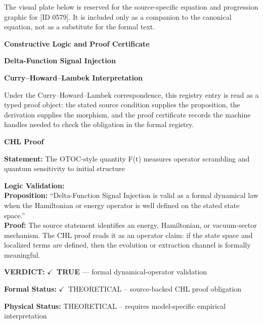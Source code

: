 \begingroup\footnotesize\sloppy
The visual plate below is reserved for the source-specific equation and progression graphic for [ID 0579]. It is included only as a companion to the canonical equation, not as a substitute for the formal text.
\par\endgroup
\ifTZPDarkEdition
{}
\fi

\clearpage
\begingroup\tzpsupportsetup
\noindent\textbf{\fontsize{10.8pt}{12.8pt}\selectfont [ID 0579] Constructive Logic and Proof Certificate}\par
\noindent\textbf{\fontsize{10pt}{12pt}\selectfont Delta-Function Signal Injection}\par
\vspace{0.45em}
\begingroup
\footnotesize
\setlength{\parskip}{0.22em}
\setlength{\parindent}{0pt}
\noindent\textbf{Curry--Howard--Lambek Interpretation}\par
Under the Curry--Howard--Lambek correspondence, this registry entry is read as a typed proof
object: the stated source condition supplies the proposition, the derivation supplies the
morphism, and the proof certificate records the machine handles needed to check the obligation
in the formal registry.

\vspace{0.45em}
\noindent\textbf{CHL Proof}\par
\textbf{Statement:} The OTOC-style quantity F(t) measures operator scrambling and quantum sensitivity to
initial structure

\textbf{Logic Validation:}\\
\textbf{Proposition:} ``Delta-Function Signal Injection is valid as a formal dynamical law when the Hamiltonian
or energy operator is well defined on the stated state space.''\\
\textbf{Proof:} The source statement identifies an energy, Hamiltonian, or vacuum-sector mechanism. The
CHL proof reads it as an operator claim: if the state space and localized terms are
defined, then the evolution or extraction channel is formally meaningful.

\textbf{VERDICT:} \ensuremath{\checkmark}\ \textbf{TRUE} --- formal dynamical-operator validation

\textbf{Formal Status:} \ensuremath{\checkmark}\ THEORETICAL -- source-backed CHL proof obligation

\textbf{Physical Status:} THEORETICAL -- requires model-specific empirical interpretation
\par\vspace{0.45em}
\par
\ifTZPDarkEdition
{}
\fi
\endgroup
\endgroup
